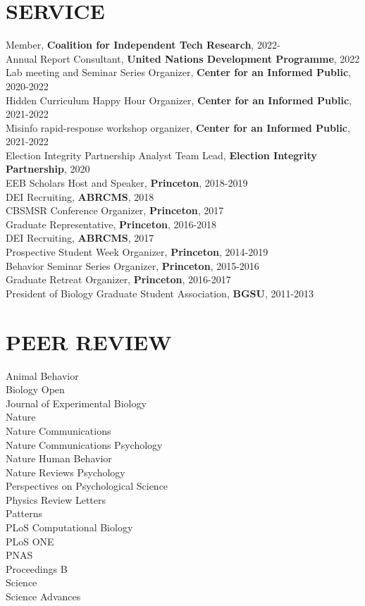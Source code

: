 \documentclass[paper=a4,fontsize=11pt]{scrartcl}
\newcommand{\NewPart}[1]{\section*{\uppercase{#1}}}
\newcommand{\EducationEntry}[4]{
		\noindent \textbf{#1} \hfill 					%
		\colorbox{White}{%
			\parbox{10em}{%
			\hfill\color{Black}#2}} \par				%
		\noindent \textit{#3} \par					%
		\noindent\hangindent=2em\hangafter=0 \small #4 	%
		\normalsize \par}
\newcommand{\codeEntry}[2]{						%
		\noindent \textbf{#1} \hfill 					%
		\colorbox{White}{\color{Black}#2} \par		%
		}
\begin{document}
\NewPart{Service}{}
Member, \textbf{Coalition for Independent Tech Research}, 2022-\\
Annual Report Consultant, \textbf{United Nations Development Programme}, 2022\\
Lab meeting and Seminar Series Organizer, \textbf{Center for an Informed Public}, 2020-2022 \\
Hidden Curriculum Happy Hour Organizer, \textbf{Center for an Informed Public}, 2021-2022 \\
Misinfo rapid-response workshop organizer, \textbf{Center for an Informed Public}, 2021-2022\\
Election Integrity Partnership Analyst Team Lead, \textbf{Election Integrity Partnership}, 2020 \\
EEB Scholars Host and Speaker, \textbf{Princeton}, 2018-2019\\
DEI Recruiting, \textbf{ABRCMS}, 2018\\
CBSMSR Conference Organizer, \textbf{Princeton}, 2017 \\
Graduate Representative, \textbf{Princeton}, 2016-2018\\
DEI Recruiting, \textbf{ABRCMS}, 2017\\
Prospective Student Week Organizer, \textbf{Princeton}, 2014-2019 \\
Behavior Seminar Series Organizer, \textbf{Princeton}, 2015-2016\\
Graduate Retreat Organizer, \textbf{Princeton}, 2016-2017\\
President of Biology Graduate Student Association, \textbf{BGSU}, 2011-2013\\





\NewPart{Peer review}{}
Animal Behavior\\
Biology Open \\
Journal of Experimental Biology\\
Nature \\
Nature Communications \\
Nature Communications Psychology \\
Nature Human Behavior \\
Nature Reviews Psychology \\ 
Perspectives on Psychological Science \\
Physics Review Letters \\
Patterns \\
PLoS Computational Biology\\
PLoS ONE\\
PNAS \\
Proceedings B\\
Science \\
Science Advances \\
\end{document}
